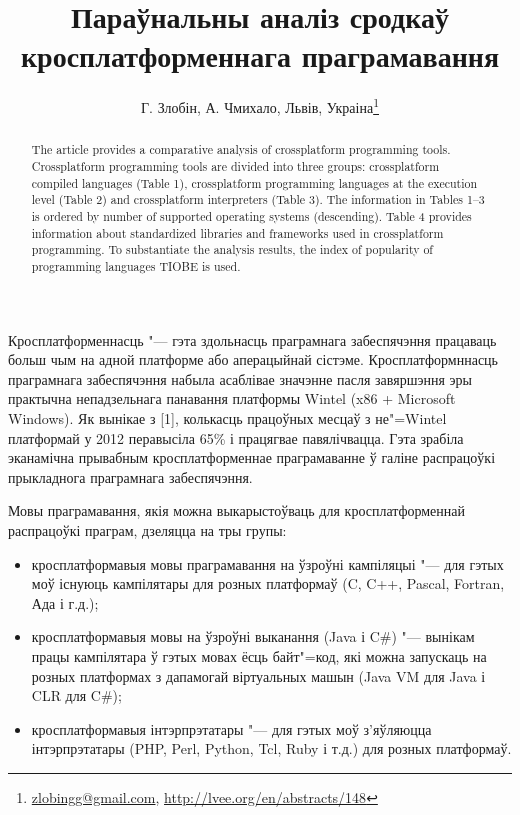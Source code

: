 \documentclass[10pt, a5paper]{article}
\begin{document}
\title{Параўнальны аналіз сродкаў кросплатформеннага праграмавання}
\author{Г. Злобін, А. Чмихало, Львів, Украіна\footnote{\url{zlobingg@gmail.com}, \url{http://lvee.org/en/abstracts/148}}}
\maketitle
\begin{abstract}
The article provides a comparative analysis of crossplatform programming tools. Crossplatform programming tools are divided into three groups: crossplatform compiled languages (Table 1), crossplatform programming languages at the execution level \linebreak (Table 2) and crossplatform interpreters (Table 3). The informa\-tion in Tables 1--3 is ordered by number of supported operating systems (descending). Table 4 provides information about \linebreak standardized libraries and frameworks used in crossplatform programming. To substantiate the analysis results, the index of popularity of programming languages ​​TIOBE is used.
\end{abstract}
Кросплатформеннасць "--- гэта здольнасць праграмнага забеспячэння працаваць больш чым на адной платформе або аперацыйнай сістэме. Кросплатформннасць праграмнага забеспячэння набыла асаблівае значэнне пасля завяршэння эры практычна непадзельнага панавання платформы Wintel (x86 + Microsoft Windows). Як вынікае з [1],   колькасць працоўных месцаў з не"=Wintel платформай у 2012 перавысіла 65\% і працягвае павялічвацца. Гэта зрабіла эканамічна прывабным кросплатформеннае праграмаванне ў галіне распрацоўкі прыкладнога праграмнага забеспячэння.

Мовы праграмавання, якія можна выкарыстоўваць для крос\-платформеннай распрацоўкі праграм, дзеляцца на тры групы:

\begin{itemize}
  \item кросплатформавыя мовы праграмавання на ўзроўні кампіляцыі "--- для гэтых моў існуюць кампілятары для розных платформаў (C, C++, Pascal, Fortran, Ада і г.д.);
  \item кросплатформавыя мовы на ўзроўні выканання (Java і C\#) "--- вынікам працы кампілятара ў гэтых мовах ёсць байт"=код, які можна запускаць на розных платформах з дапамогай віртуальных машын (Java VM для Java і CLR для C\#);
  \item кросплатформавыя інтэрпрэтатары "--- для гэтых моў \linebreak з'яўляюцца інтэрпрэтатары (PHP, Perl, Python, Tcl, Ruby і т.д.) для розных платформаў.
\end{itemize}
\end{document}

